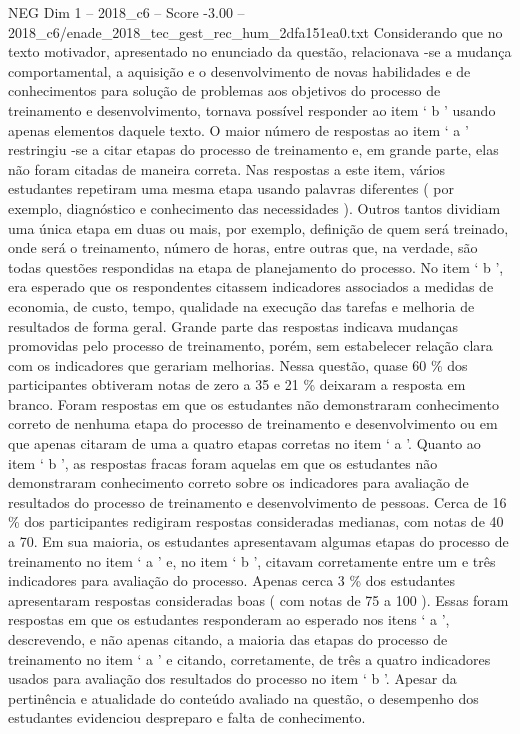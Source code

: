 \begin{textsample}{NEG Dim 1 – 2018\_c6 – Score -3.00 – 2018\_c6/enade\_2018\_tec\_gest\_rec\_hum\_2dfa151ea0.txt}
Considerando que no texto motivador, apresentado no enunciado da questão, relacionava -se a mudança comportamental, a aquisição e o desenvolvimento de novas habilidades e de conhecimentos para solução de problemas aos objetivos do processo de treinamento e desenvolvimento, tornava possível responder ao item ‘ b ’ usando apenas elementos daquele texto.
O maior número de respostas ao item ‘ a ’ restringiu -se a citar etapas do processo de treinamento e, em grande parte, elas não foram citadas de maneira correta.
Nas respostas a este item, vários estudantes repetiram uma mesma etapa usando palavras diferentes ( por exemplo, diagnóstico e conhecimento das necessidades ).
Outros tantos dividiam uma única etapa em duas ou mais, por exemplo, definição de quem será treinado, onde será o treinamento, número de horas, entre outras que, na verdade, são todas questões respondidas na etapa de planejamento do processo.
No item ‘ b ’, era esperado que os respondentes citassem indicadores associados a medidas de economia, de custo, tempo, qualidade na execução das tarefas e melhoria de resultados de forma geral.
Grande parte das respostas indicava mudanças promovidas pelo processo de treinamento, porém, sem estabelecer relação clara com os indicadores que gerariam melhorias.
Nessa questão, quase 60 \% dos participantes obtiveram notas de zero a 35 e 21 \% deixaram a resposta em branco.
Foram respostas em que os estudantes não demonstraram conhecimento correto de nenhuma etapa do processo de treinamento e desenvolvimento ou em que apenas citaram de uma a quatro etapas corretas no item ‘ a ’.
Quanto ao item ‘ b ’, as respostas fracas foram aquelas em que os estudantes não demonstraram conhecimento correto sobre os indicadores para avaliação de resultados do processo de treinamento e desenvolvimento de pessoas.
Cerca de 16 \% dos participantes redigiram respostas consideradas medianas, com notas de 40 a 70.
Em sua maioria, os estudantes apresentavam algumas etapas do processo de treinamento no item ‘ a ’ e, no item ‘ b ’, citavam corretamente entre um e três indicadores para avaliação do processo.
Apenas cerca 3 \% dos estudantes apresentaram respostas consideradas boas ( com notas de 75 a 100 ).
Essas foram respostas em que os estudantes responderam ao esperado nos itens ‘ a ’, descrevendo, e não apenas citando, a maioria das etapas do processo de treinamento no item ‘ a ’ e citando, corretamente, de três a quatro indicadores usados para avaliação dos resultados do processo no item ‘ b ’.
Apesar da pertinência e atualidade do conteúdo avaliado na questão, o desempenho dos estudantes evidenciou despreparo e falta de conhecimento.

\end{textsample}
